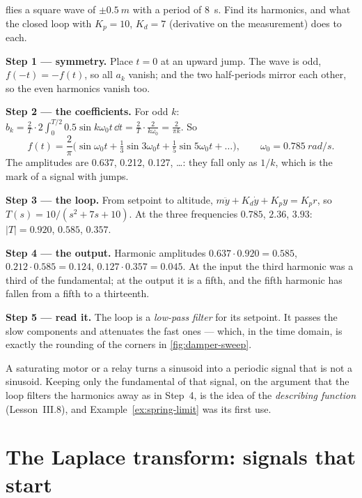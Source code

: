 \begin{example}
\label{ex:C-square}
 flies a square wave of $\pm\SI{0.5}{m}$ with a period of \SI{8}{s}. Find its harmonics, and what the closed loop with $K_p = 10$, $K_d = 7$ (derivative on the measurement) does to each.

\textbf{Step 1 — symmetry.} Place $t = 0$ at an upward jump. The wave is odd, $f(-t) = -f(t)$, so all $a_k$ vanish; and the two half-periods mirror each other, so the even harmonics vanish too.

\textbf{Step 2 — the coefficients.} For odd $k$: $b_k = \frac{2}{T} \cdot 2\int_0^{T/2} 0.5\sin k\omega_0t\,\dd t = \frac{2}{T} \cdot \frac{2}{k\omega_0} = \frac{2}{\pi k}$. So
\begin{equation*}
  f(t) = \frac{2}{\pi}\Big(\sin\omega_0t + \tfrac13\sin3\omega_0t + \tfrac15\sin5\omega_0t + \dots\Big), \qquad \omega_0 = \SI{0.785}{rad/s} .
\end{equation*}
The amplitudes are 0.637, 0.212, 0.127, \dots: they fall only as $1/k$, which is the mark of a signal with jumps.

\textbf{Step 3 — the loop.} From setpoint to altitude, $m\ddot y + K_d\dot y + K_py = K_pr$, so $T(s) = 10/(s^2 + 7s + 10)$. At the three frequencies $0.785$, $2.36$, $3.93$: $|T| = 0.920$, $0.585$, $0.357$.

\textbf{Step 4 — the output.} Harmonic amplitudes $0.637 \cdot 0.920 = 0.585$, $0.212 \cdot 0.585 = 0.124$, $0.127 \cdot 0.357 = 0.045$. At the input the third harmonic was a third of the fundamental; at the output it is a fifth, and the fifth harmonic has fallen from a fifth to a thirteenth.

\textbf{Step 5 — read it.} The loop is a \emph{low-pass filter} for its setpoint. It passes the slow components and attenuates the fast ones — which, in the time domain, is exactly the rounding of the corners in \cref{fig:damper-sweep}.
\end{example}

A saturating motor or a relay turns a sinusoid into a periodic signal that is not a sinusoid. Keeping only the fundamental of that signal, on the argument that the loop filters the harmonics away as in Step~4, is the idea of the \emph{describing function} (Lesson~III.8), and Example~\ref{ex:spring-limit} was its first use.

\section{The Laplace transform: signals that start}

